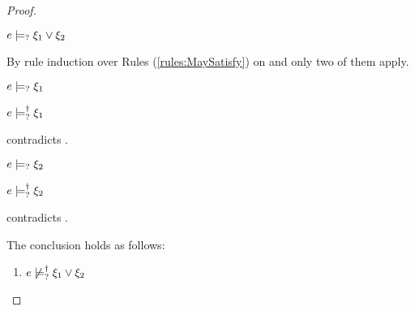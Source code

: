 \begin{proof}
\begin{byCases}
\begin{byCases}
  \end{byCases}

\item[\text{(\ref{rule:CSMSMay})}]
  \begin{pfsteps*}
  \item $e \models_{?} \xi_1 \vee \xi_2$  
  \end{pfsteps*}
  By rule induction over Rules (\ref{rules:MaySatisfy}) on  and only two of them apply.
  \begin{byCases}

  \item[\text{(\ref{rule:CMSOr1})}]
    \begin{pfsteps*}
    \item $e \models_{?} \xi_1$  
    \item $e \models_{?}^{\dag} \xi_1$  
    \end{pfsteps*}
     contradicts .

  \item[\text{(\ref{rule:CMSOr2})}]
    \begin{pfsteps*}
    \item $e \models_{?} \xi_2$  
    \item $e \models_{?}^{\dag} \xi_2$  
    \end{pfsteps*}
     contradicts .

  \end{byCases}
\end{byCases}
The conclusion holds as follows:
\begin{enumerate}
  \item $e \not\models_{?}^{\dag} \xi_1 \vee \xi_2$
\end{enumerate}
\resetpfcounter
\end{proof}

